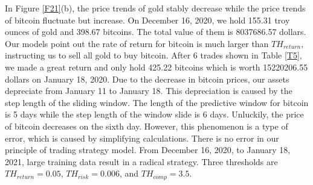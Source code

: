 \documentclass[12pt]{article}
\begin{document}
In Figure \ref{F21}(b), the price trends of gold stably decrease while the price trends of bitcoin fluctuate but increase. On December 16, 2020, we hold 155.31 troy ounces of gold and 398.67 bitcoins. The total value of them is 8037686.57 dollars. Our models point out the rate of return for bitcoin is much larger than $TH_{return}$, instructing us to sell all gold to buy bitcoin. After 6 trades shown in Table \ref{T5}, we made a great return and only hold 425.22 bitcoins which is worth 15220206.55 dollars on January 18, 2020. Due to the decrease in bitcoin prices, our assets depreciate from January 11 to January 18. This depreciation is caused by the step length of the sliding window. The length of the predictive window for bitcoin is 5 days while the step length of the window slide is 6 days. Unluckily, the price of bitcoin decreases on the sixth day. However, this phenomenon is a type of error, which is caused by simplifying calculations. There is no error in our principle of trading strategy model. From December 16, 2020, to January 18, 2021, large training data result in a radical strategy. Three thresholds are $TH_{return}=0.05$, $TH_{risk}=0.006$, and $TH_{comp}=3.5$.
\end{document}
